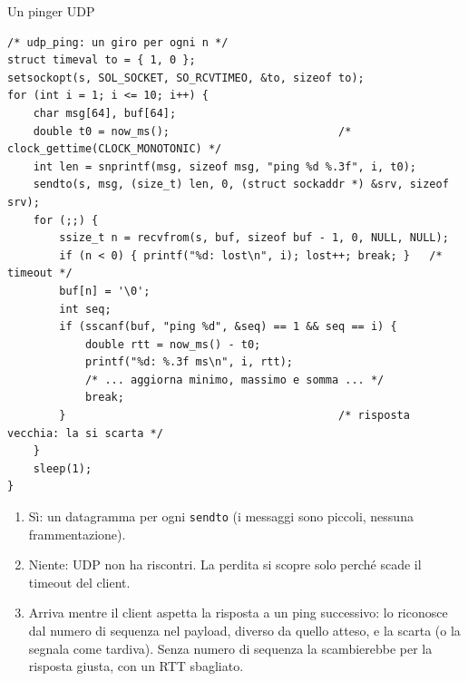\begin{esercizio}{Un pinger UDP}
\begin{lstlisting}[language={[POSIX]C}]
/* udp_ping: un giro per ogni n */
struct timeval to = { 1, 0 };
setsockopt(s, SOL_SOCKET, SO_RCVTIMEO, &to, sizeof to);
for (int i = 1; i <= 10; i++) {
    char msg[64], buf[64];
    double t0 = now_ms();                          /* clock_gettime(CLOCK_MONOTONIC) */
    int len = snprintf(msg, sizeof msg, "ping %d %.3f", i, t0);
    sendto(s, msg, (size_t) len, 0, (struct sockaddr *) &srv, sizeof srv);
    for (;;) {
        ssize_t n = recvfrom(s, buf, sizeof buf - 1, 0, NULL, NULL);
        if (n < 0) { printf("%d: lost\n", i); lost++; break; }   /* timeout */
        buf[n] = '\0';
        int seq;
        if (sscanf(buf, "ping %d", &seq) == 1 && seq == i) {
            double rtt = now_ms() - t0;
            printf("%d: %.3f ms\n", i, rtt);
            /* ... aggiorna minimo, massimo e somma ... */
            break;
        }                                          /* risposta vecchia: la si scarta */
    }
    sleep(1);
}
\end{lstlisting}
\begin{enumerate}[label=(\alph*)]
    \item Sì: un datagramma per ogni \texttt{sendto} (i messaggi sono piccoli, nessuna frammentazione).
    \item Niente: UDP non ha riscontri. La perdita si scopre solo perché scade il timeout del client.
    \item Arriva mentre il client aspetta la risposta a un ping successivo: lo riconosce dal numero di sequenza nel payload, diverso da
          quello atteso, e la scarta (o la segnala come tardiva). Senza numero di sequenza la scambierebbe per la risposta giusta, con un RTT
          sbagliato.
\end{enumerate}
\end{esercizio}

